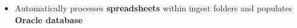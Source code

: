 \begin{cventries}
{\begin{cvitems}
        \begin{itemize}
			\item{Automatically processes \textbf{spreadsheets} within ingest folders and populates \textbf{Oracle database}}
        \end{itemize}
        \end{cvitems}
    }
	\vspace{-1.0em}
\end{cventries}
